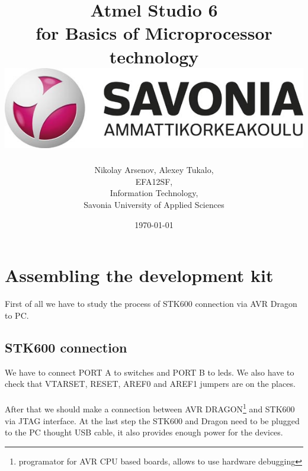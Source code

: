 \documentclass[english]{article}
\date{}
\begin{document}
\title{\vspace{2in}    Atmel Studio 6\\
\small for Basics of Microprocessor technology\\
\vspace{0.5in}\includegraphics{savonia.jpg}}

\nopagebreak
\maketitle


\vspace{3in}

\author{
\begin{flushright}
Nikolay Arsenov, Alexey Tukalo,\\
EFA12SF,\\
Information Technology,\\
Savonia University of Applied Sciences
\end{flushright}
}

\date{\today}
\thispagestyle{empty}

\newpage
\setcounter{page}{1}
\setcounter{tocdepth}{2}
\tableofcontents

\newpage


\section{Assembling the development kit}
First of all we have to study the process of STK600 connection via AVR Dragon to PC. 
\subsection{STK600 connection} 
We have to connect PORT A to switches and PORT B to leds. We also have to check that VTARSET, RESET, AREF0 and AREF1 jumpers are on the places.\\\\
After that we should make a connection between AVR DRAGON\footnote{programator for AVR CPU based boards, allows to use hardware debugging} and STK600 via JTAG interface. At the last step the STK600 and Dragon need to be plugged to the PC thought USB cable, it also provides enough power for the devices.
\end{document}
